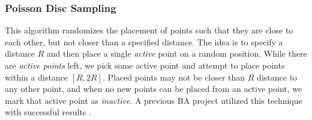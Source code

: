 \subsubsection{Poisson Disc Sampling}

This algorithm randomizes the placement of points such that they are close to each other, but not closer than a specified distance.
The idea is to specify a distance $R$ and then place a single \textit{active} point on a random position.
While there are \textit{active points} left, we pick some active point and attempt to place points within a distance $[R, 2R]$.
Placed points may not be closer than $R$ distance to any other point, and when no new points can be placed from an active point, we mark that active point as \textit{inactive}.
A previous BA project utilized this technique with successful results \cite{ba_landscape}.
